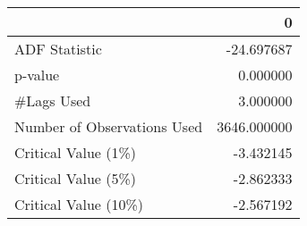 \begin{tabular}{lr}
\toprule
{} &            0 \\
\midrule
ADF Statistic               &   -24.697687 \\
p-value                     &     0.000000 \\
\#Lags Used                  &     3.000000 \\
Number of Observations Used &  3646.000000 \\
Critical Value (1\%)         &    -3.432145 \\
Critical Value (5\%)         &    -2.862333 \\
Critical Value (10\%)        &    -2.567192 \\
\bottomrule
\end{tabular}
